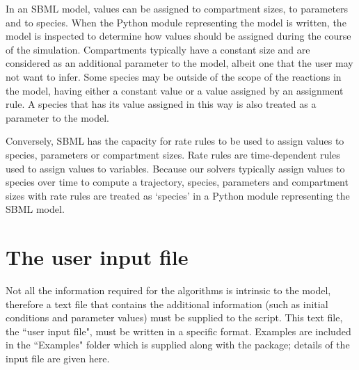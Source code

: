 \documentclass[a4paper]{report}
\begin{document}
In an SBML model, values can be assigned to compartment sizes, to parameters and to species. When the Python module representing the model is written, the model is inspected to determine how values should be assigned during the course of the simulation. Compartments typically have a constant size and are considered as an additional parameter to the model, albeit one that the user may not want to infer. Some species may be outside of the scope of the reactions in the model, having either a constant value or a value assigned by an assignment rule. A species that has its value assigned in this way is also treated as a parameter to the model.

Conversely, SBML has the capacity for rate rules to be used to assign values to species, parameters or compartment sizes. Rate rules are time-dependent rules used to assign values to variables. Because our solvers typically assign values to species over time to compute a trajectory, species, parameters and compartment sizes with rate rules are treated as `species' in a Python module representing the SBML model.
\section{The user input file}
Not all the information required for the algorithms is intrinsic to the model, therefore a text file that contains the additional information (such as initial conditions and parameter values) must be supplied to the script. This text file,  the ``user input file", must be written in a specific format. Examples are included in the ``Examples" folder which is supplied along with the package; details of the input file are given here.
\end{document}
